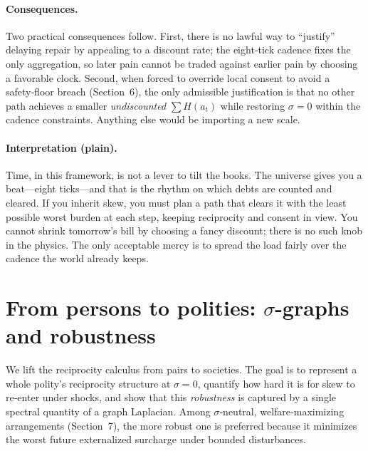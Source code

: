 \documentclass[11pt]{article}
\begin{document}
\paragraph{Consequences.}
Two practical consequences follow. First, there is no lawful way to “justify” delaying repair by appealing to a discount rate; the eight‑tick cadence fixes the only aggregation, so later pain cannot be traded against earlier pain by choosing a favorable clock. Second, when forced to override local consent to avoid a safety‑floor breach (Section~6), the only admissible justification is that no other path achieves a smaller \emph{undiscounted} $\sum H(a_t)$ while restoring $\sigma=0$ within the cadence constraints. Anything else would be importing a new scale.

\paragraph{Interpretation (plain).}
Time, in this framework, is not a lever to tilt the books. The universe gives you a beat—eight ticks—and that is the rhythm on which debts are counted and cleared. If you inherit skew, you must plan a path that clears it with the least possible worst burden at each step, keeping reciprocity and consent in view. You cannot shrink tomorrow’s bill by choosing a fancy discount; there is no such knob in the physics. The only acceptable mercy is to spread the load fairly over the cadence the world already keeps.

\section{From persons to polities: $\sigma$-graphs and robustness}

We lift the reciprocity calculus from pairs to societies. The goal is to represent a whole polity’s reciprocity structure at $\sigma\!=\!0$, quantify how hard it is for skew to re‑enter under shocks, and show that this \emph{robustness} is captured by a single spectral quantity of a graph Laplacian. Among $\sigma$‑neutral, welfare‑maximizing arrangements (Section~7), the more robust one is preferred because it minimizes the worst future externalized surcharge under bounded disturbances.
\end{document}
